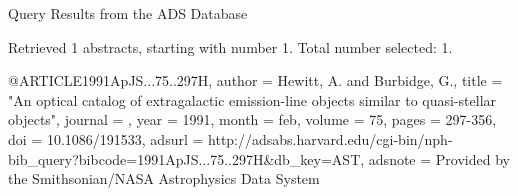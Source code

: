 Query Results from the ADS Database


Retrieved 1 abstracts, starting with number 1.  Total number selected: 1.

@ARTICLE{1991ApJS...75..297H,
   author = {{Hewitt}, A. and {Burbidge}, G.},
    title = "{An optical catalog of extragalactic emission-line objects similar to quasi-stellar objects}",
  journal = {\apjs},
     year = 1991,
    month = feb,
   volume = 75,
    pages = {297-356},
      doi = {10.1086/191533},
   adsurl = {http://adsabs.harvard.edu/cgi-bin/nph-bib_query?bibcode=1991ApJS...75..297H&db_key=AST},
  adsnote = {Provided by the Smithsonian/NASA Astrophysics Data System}
}


